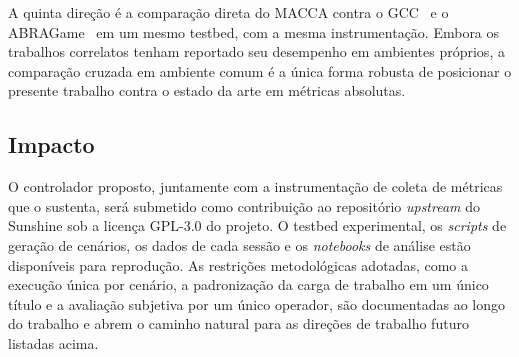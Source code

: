 \documentclass[conference]{IEEEtran}
\begin{document}
A quinta direção é a comparação direta do MACCA contra o
GCC~\cite{gcc} e o ABRAGame~\cite{abragame} em um mesmo
testbed, com a mesma instrumentação. Embora os trabalhos
correlatos tenham reportado seu desempenho em ambientes
próprios, a comparação cruzada em ambiente comum é a única
forma robusta de posicionar o presente trabalho contra o
estado da arte em métricas absolutas.

\subsection{Impacto}

O controlador proposto, juntamente com a instrumentação de
coleta de métricas que o sustenta, será submetido como
contribuição ao repositório \emph{upstream} do Sunshine sob a
licença GPL-3.0 do projeto. O testbed experimental, os
\emph{scripts} de geração de cenários, os dados de cada
sessão e os \emph{notebooks} de análise estão disponíveis para
reprodução. As restrições metodológicas adotadas, como a
execução única por cenário, a padronização da carga de
trabalho em um único título e a avaliação subjetiva por um
único operador, são documentadas ao longo do trabalho e
abrem o caminho natural para as direções de trabalho futuro
listadas acima.





\end{document}
